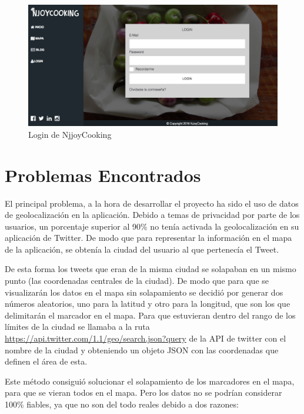 \begin{figure}
\begin{center}
\includegraphics[width=1.0\textwidth]{imagenes/login-resultado.png}
\caption{Login de NjjoyCooking}
\label{login-resultado}
\end{center}
\end{figure}


\section{Problemas Encontrados}

El principal problema, a la hora de desarrollar el proyecto ha sido el uso de datos de geolocalización en la aplicación. Debido a temas de privacidad por parte de los usuarios, un porcentaje superior al 90\% no tenía activada la geolocalización en su aplicación de Twitter. De modo que para representar la información en el mapa de la aplicación, se obtenía la ciudad del usuario al que pertenecía el Tweet.

\vspace{5 mm}

De esta forma los tweets que eran de la misma ciudad se solapaban en un mismo punto (las coordenadas centrales de la ciudad). De modo que para que se visualizarán los datos en el mapa sin solapamiento se decidió por generar dos números aleatorios, uno para la latitud y otro para la longitud, que son los que delimitarán el marcador en el mapa. Para que estuvieran dentro del rango de los límites de la ciudad se llamaba a la ruta \url{https://api.twitter.com/1.1/geo/search.json?query} de la API de twitter con el nombre de la ciudad y obteniendo un objeto JSON con las coordenadas que definen el área
de esta.


Este método consiguió solucionar el solapamiento de los marcadores en el mapa, para que se vieran todos en el mapa. Pero los datos no se podrían considerar 100\% fiables, ya que no son del todo reales debido a dos razones:

